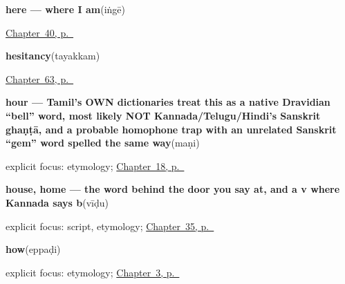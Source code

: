 \noindent\begin{minipage}[t]{\linewidth}
\raggedright
\textbf{here — where I am}\enspace\emph{}\enspace(iṅgē)\par
\footnotesize \hyperref[ch:ta-pointing-and-asking]{Chapter~40, p.~\pageref*{ch:ta-pointing-and-asking}}
\end{minipage}\par\smallskip

\noindent\begin{minipage}[t]{\linewidth}
\raggedright
\textbf{hesitancy}\enspace\emph{}\enspace(tayakkam)\par
\footnotesize \hyperref[ch:ta-asking-well]{Chapter~63, p.~\pageref*{ch:ta-asking-well}}
\end{minipage}\par\smallskip

\noindent\begin{minipage}[t]{\linewidth}
\raggedright
\textbf{hour — Tamil's OWN dictionaries treat this as a native Dravidian \textquotedblleft{}bell\textquotedblright{} word, most likely NOT Kannada/Telugu/Hindi's Sanskrit ghaṇṭā, and a probable homophone trap with an unrelated Sanskrit \textquotedblleft{}gem\textquotedblright{} word spelled the same way}\enspace\emph{}\enspace(maṇi)\par
\footnotesize explicit focus: etymology; \hyperref[ch:ta-telling-time]{Chapter~18, p.~\pageref*{ch:ta-telling-time}}
\end{minipage}\par\smallskip

\noindent\begin{minipage}[t]{\linewidth}
\raggedright
\textbf{house, home — the word behind the door you say  at, and a v where Kannada says b}\enspace\emph{}\enspace(vīḍu)\par
\footnotesize explicit focus: script, etymology; \hyperref[ch:ta-arriving-at-a-house]{Chapter~35, p.~\pageref*{ch:ta-arriving-at-a-house}}
\end{minipage}\par\smallskip

\noindent\begin{minipage}[t]{\linewidth}
\raggedright
\textbf{how}\enspace\emph{}\enspace(eppaḍi)\par
\footnotesize explicit focus: etymology; \hyperref[ch:responding]{Chapter~3, p.~\pageref*{ch:responding}}
\end{minipage}\par\smallskip

